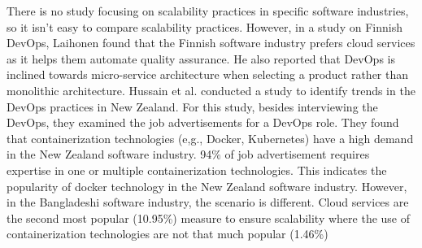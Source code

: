 There is no study focusing on scalability practices in specific software industries, so it isn't easy to compare scalability practices. However, in a study on Finnish DevOps, Laihonen\citep{Laihonen2018} found that the Finnish software industry prefers cloud services as it helps them automate quality assurance. He also reported that DevOps is inclined towards micro-service architecture when selecting a product rather than monolithic architecture. Hussain et al.\citep{Hussain2017} conducted a study to identify trends in the DevOps practices in New Zealand. For this study, besides interviewing the DevOps, they examined the job advertisements for a DevOps role. They found that containerization technologies (e,g., Docker, Kubernetes) have a high demand in the New Zealand software industry. 94\% of job advertisement requires expertise in one or multiple containerization technologies. This indicates the popularity of docker technology in the New Zealand software industry. However, in the Bangladeshi software industry, the scenario is different. Cloud services are the second most popular (10.95\%) measure to ensure scalability where the use of containerization technologies are not that much popular (1.46\%)